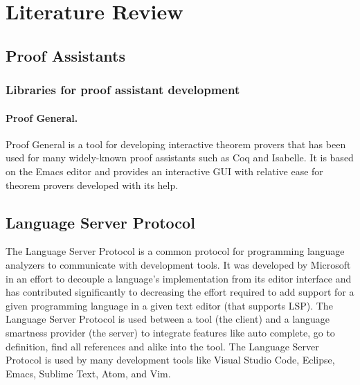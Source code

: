 \chapter{Literature Review}
\label{chap:lr}

\section{Proof Assistants}

\subsection{Libraries for proof assistant development}

\subsubsection{Proof General.}

Proof General \cite{Aspinall2000} is a tool for developing interactive theorem
provers that has been used for many widely-known proof assistants such as Coq
and Isabelle.
It is based on the Emacs editor and provides an interactive GUI with relative
ease for theorem provers developed with its help.


\section{Language Server Protocol}

The Language Server Protocol is a common protocol for programming language analyzers to communicate with development tools. It was developed by Microsoft in an effort to decouple a language's implementation from its editor interface \cite{Buender2019} and has contributed significantly to decreasing the effort required to add support for a given programming language in a given text editor (that supports LSP). The Language Server Protocol is used between a tool (the client) and a language smartness provider (the server) to integrate features like auto complete, go to definition, find all references and alike into the tool. The Language Server Protocol is used by many development tools like Visual Studio Code, Eclipse, Emacs, Sublime Text, Atom, and Vim.

